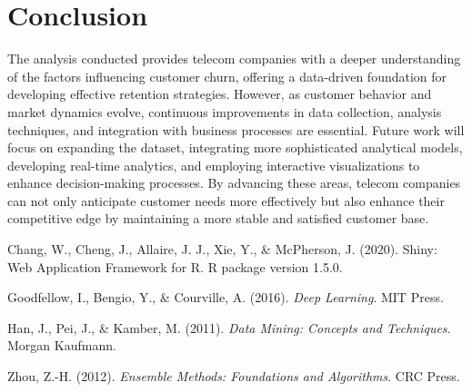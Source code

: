 \documentclass[12pt]{article}
\begin{document}
\section{Conclusion}
The analysis conducted provides telecom companies with a deeper understanding of the factors influencing customer churn, offering a data-driven foundation for developing effective retention strategies. However, as customer behavior and market dynamics evolve, continuous improvements in data collection, analysis techniques, and integration with business processes are essential. Future work will focus on expanding the dataset, integrating more sophisticated analytical models, developing real-time analytics, and employing interactive visualizations to enhance decision-making processes. By advancing these areas, telecom companies can not only anticipate customer needs more effectively but also enhance their competitive edge by maintaining a more stable and satisfied customer base.


\begin{thebibliography}{9}

Chang, W., Cheng, J., Allaire, J. J., Xie, Y., \& McPherson, J. (2020). Shiny: Web Application Framework for R. R package version 1.5.0.

Goodfellow, I., Bengio, Y., \& Courville, A. (2016). \textit{Deep Learning}. MIT Press.

Han, J., Pei, J., \& Kamber, M. (2011). \textit{Data Mining: Concepts and Techniques}. Morgan Kaufmann.

Zhou, Z.-H. (2012). \textit{Ensemble Methods: Foundations and Algorithms}. CRC Press.

\end{thebibliography}
\end{document}
